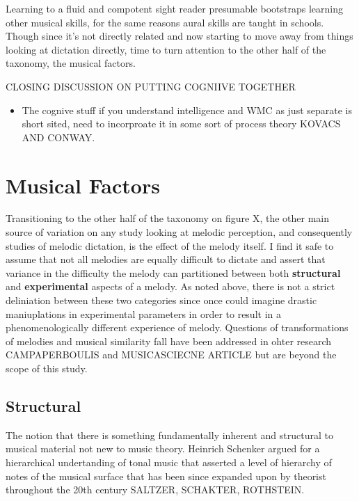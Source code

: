 \documentclass[]{book}
\providecommand{\tightlist}{%
  \setlength{\itemsep}{0pt}\setlength{\parskip}{0pt}}
\theoremstyle{definition}
\theoremstyle{definition}
\theoremstyle{definition}
\theoremstyle{remark}
\begin{document}
Learning to a fluid and compotent sight reader presumable bootstraps
learning other musical skills, for the same reasons aural skills are
taught in schools. Though since it's not directly related and now
starting to move away from things looking at dictation directly, time to
turn attention to the other half of the taxonomy, the musical factors.

CLOSING DISCUSSION ON PUTTING COGNIIVE TOGETHER

\begin{itemize}
\tightlist
\item
  The cognive stuff if you understand intelligence and WMC as just
  separate is short sited, need to incorproate it in some sort of
  process theory KOVACS AND CONWAY.
\end{itemize}

\hypertarget{musical-factors}{%
\section{Musical Factors}\label{musical-factors}}

Transitioning to the other half of the taxonomy on figure X, the other
main source of variation on any study looking at melodic perception, and
consequently studies of melodic dictation, is the effect of the melody
itself. I find it safe to assume that not all melodies are equally
difficult to dictate and assert that variance in the difficulty the
melody can partitioned between both \textbf{structural} and
\textbf{experimental} aspects of a melody. As noted above, there is not
a strict deliniation between these two categories since once could
imagine drastic maniuplations in experimental parameters in order to
result in a phenomenologically different experience of melody. Questions
of transformations of melodies and musical similarity fall have been
addressed in ohter research CAMPAPERBOULIS and MUSICASCIECNE ARTICLE but
are beyond the scope of this study.

\hypertarget{structural}{%
\subsection{Structural}\label{structural}}

The notion that there is something fundamentally inherent and structural
to musical material not new to music theory. Heinrich Schenker argued
for a hierarchical undertanding of tonal music
\citep{schenkerFreieSatz1935} that asserted a level of hierarchy of
notes of the musical surface that has been since expanded upon by
theorist throughout the 20th century SALTZER, SCHAKTER, ROTHSTEIN.
\end{document}
